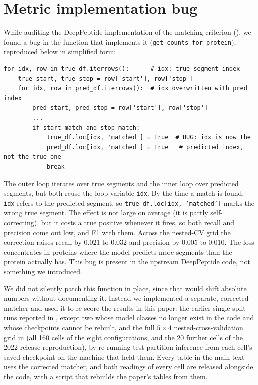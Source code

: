 \documentclass{article}
\begin{document}
\FloatBarrier

\section{Metric implementation bug}
\label{sec:eval-metric}


While auditing the DeepPeptide implementation of the matching criterion (), we found a bug in the function that implements it (\texttt{get\_counts\_for\_protein}), reproduced below in simplified form:

\begin{lstlisting}
for idx, row in true_df.iterrows():      # idx: true-segment index
    true_start, true_stop = row['start'], row['stop']
    for idx, row in pred_df.iterrows():  # idx overwritten with pred index
        pred_start, pred_stop = row['start'], row['stop']
        ...
        if start_match and stop_match:
            true_df.loc[idx, 'matched'] = True  # BUG: idx is now the
            pred_df.loc[idx, 'matched'] = True   # predicted index, not the true one
            break
\end{lstlisting}

The outer loop iterates over true segments and the inner loop over predicted segments, but both reuse the loop variable \texttt{idx}. By the time a match is found, \texttt{idx} refers to the predicted segment, so \texttt{true\_df.loc[idx, 'matched']} marks the wrong true segment. The effect is not large on average (it is partly self-correcting), but it costs a true positive whenever it fires, so both recall and precision come out low, and F1 with them. Across the nested-CV grid the correction raises recall by $0.021$ to $0.032$ and precision by $0.005$ to $0.010$. The loss concentrates in proteins where the model predicts more segments than the protein actually has. This bug is present in the upstream DeepPeptide code, not something we introduced.

We did not silently patch this function in place, since that would shift absolute numbers without documenting it. Instead we implemented a separate, corrected matcher and used it to re-score the results in this paper: the earlier single-split runs reported in , except two whose model classes no longer exist in the code and whose checkpoints cannot be rebuilt, and the full $5\times4$ nested-cross-validation grid in  (all 160 cells of the eight configurations, and the 20 further cells of the 2022-release reproduction), by re-running test-partition inference from each cell's saved checkpoint on the machine that held them. Every table in the main text uses the corrected matcher, and both readings of every cell are released alongside the code, with a script that rebuilds the paper's tables from them.
\end{document}
